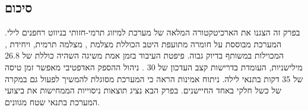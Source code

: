 \subsection{סיכום}
\label{sec:ch07_summary}

בפרק זה הצגנו את הארכיטקטורה המלאה של מערכת  למיזוג תרמי-חזותי בניווט רחפנים לילי. המערכת מבוססת על חומרה מתועפת היטב הכוללת מצלמת , מצלמה תרמית, ויחידת , המכוילות במשותף בדיוק גבוה. פיפטת העיבוד בזמן אמת משיגה השהיה כוללת של 26.8 מילישניות, העומדת בדרישות קצב העדכון של 30 . ניהול ההספק האדפטיבי מאפשר זמן טיסה של 35 דקות בתנאי לילה. ניתוח אמינות הראה כי המערכת מסוגלת להמשיך לפעול גם במקרה של כשל חלקי באחד החיישנים. בפרק הבא נציג תוצאות ניסוייות הממחישות את ביצועי המערכת בתנאי שטח מגוונים.

